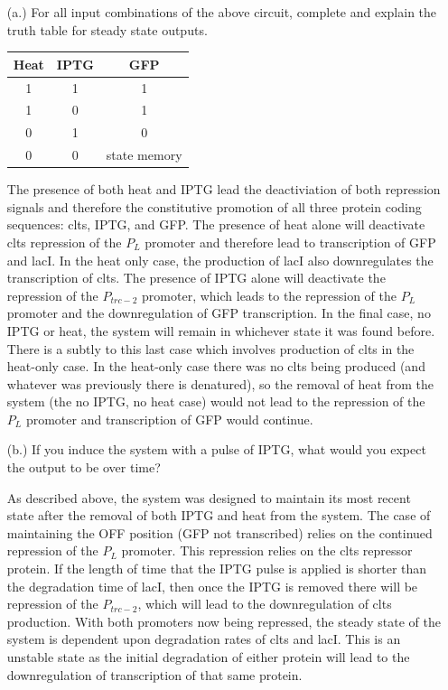 \documentclass[11pt]{article}
\begin{document}
\begin{itemize}

\item[(a.)]For all input combinations of the above circuit, complete and explain the truth table for steady state outputs.

{
  \centering
  \begin{tabular}{ c | c || c }
  Heat & IPTG  & GFP \\
  \hline
  1 & 1 & 1 \\
  1 & 0 & 1 \\
  0 & 1 & 0 \\
  0 & 0 & state memory \\
  \end{tabular}
  \par
}

The presence of both heat and IPTG lead the deactiviation of both repression signals and therefore the constitutive promotion of all three protein coding sequences: clts, IPTG, and GFP. The presence of heat alone will deactivate clts repression of the $P_L$ promoter and therefore lead to transcription of GFP and lacI. In the heat only case, the production of lacI also downregulates the transcription of clts. The presence of IPTG alone will deactivate the repression of the $P_{trc-2}$ promoter, which leads to the repression of the $P_L$ promoter and the downregulation of GFP transcription. In the final case, no IPTG or heat, the system will remain in whichever state it was found before. There is a subtly to this last case which involves production of clts in the heat-only case. In the heat-only case there was no clts being produced (and whatever was previously there is denatured), so the removal of heat from the system (the no IPTG, no heat case)  would not lead to the repression of the $P_L$ promoter and transcription of GFP would continue. 

\item[(b.)]If you induce the system with a pulse of IPTG, what would you expect the output to be over time?

As described above, the system was designed to maintain its most recent state after the removal of both IPTG and heat from the system. The case of maintaining the OFF position (GFP not transcribed) relies on the continued repression of the $P_L$ promoter. This repression relies on the clts repressor protein. If the length of time that the IPTG pulse is applied is shorter than the degradation time of lacI, then once the IPTG is removed there will be repression of the $P_{trc-2}$, which will lead to the downregulation of clts production. With both promoters now being repressed, the steady state of the system is dependent upon degradation rates of clts and lacI. This is an unstable state as the initial degradation of either protein will lead to the downregulation of transcription of that same protein. 


\end{itemize}
\end{document}
